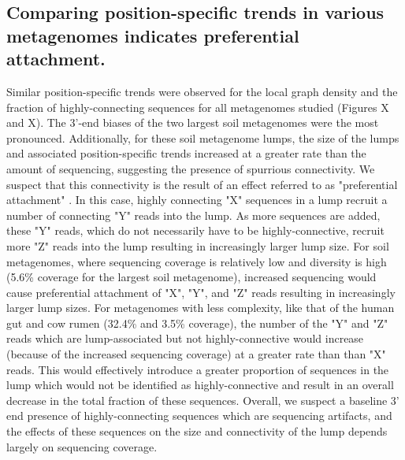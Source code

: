\documentclass[11pt]{article} %
\begin{document}
\subsection{Comparing position-specific trends in various metagenomes indicates preferential attachment.}
Similar position-specific trends were observed for the local graph density and the fraction of highly-connecting sequences for all metagenomes studied (Figures X and X).  The 3'-end biases of the two largest soil metagenomes were the most pronounced.  Additionally, for these soil metagenome lumps, the size of the lumps and associated position-specific trends increased at a greater rate than the amount of sequencing, suggesting the presence of spurrious connectivity.  We suspect that this connectivity is the result of an effect referred to as "preferential attachment" \cite{Barabasi:1999p1083}. In this case, highly connecting "X" sequences in a lump recruit a number of connecting "Y" reads into the lump.  As more sequences are added, these "Y" reads, which do not necessarily have to be highly-connective, recruit more "Z" reads into the lump resulting in increasingly larger lump size.  For soil metagenomes, where sequencing coverage is relatively low and diversity is high (5.6\% coverage for the largest soil metagenome), increased sequencing would cause preferential attachment of "X", "Y", and "Z" reads resulting in increasingly larger lump sizes.  For metagenomes with less complexity, like that of the human gut and cow rumen (32.4\% and 3.5\% coverage), the number of the "Y" and "Z" reads which are lump-associated but not highly-connective would increase (because of the increased sequencing coverage) at a greater rate than than "X" reads.   This would effectively introduce a greater proportion of sequences in the lump which would not be identified as highly-connective and result in an overall decrease in the total fraction of these sequences.  Overall, we suspect a baseline 3' end presence of highly-connecting sequences which are sequencing artifacts, and the effects of these sequences on the size and connectivity of the lump depends largely on sequencing coverage.
\end{document}
